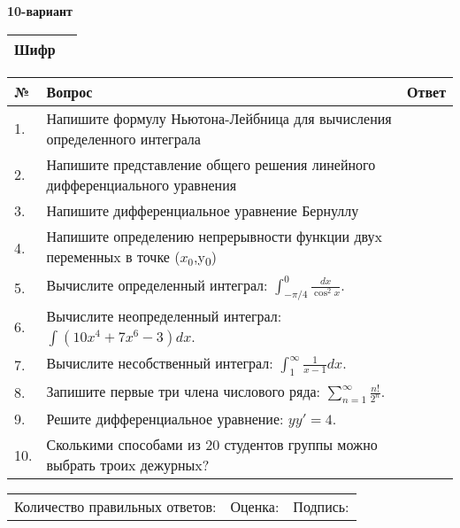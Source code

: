 \documentclass{article}
\begin{document}
  \egroup
  
  \newpage
  
  
  \textbf{10-вариант}\\
  
  \bgroup
  \def\arraystretch{1.6} %
  
  \begin{tabular}{|m{5.7cm}|m{9.5cm}|}
  \hline
  Шифр & \\
  \hline
  \end{tabular}
  
  \vspace{1cm}
  
  \begin{tabular}{|m{0.7cm}|m{10cm}|m{4cm}|}
  \hline
  № & Вопрос & Ответ \\
  \hline
  1. & Напишите формулу Ньютона-Лейбница для вычисления определенного интеграла &  \\
  \hline
  2. & Напишите представление общего решения линейного дифференциального уравнения &  \\
  \hline
  3. & Напишите дифференциальное уравнение Бернуллу &  \\
  \hline
  4. & Напишите определению непрерывности функции двуx переменныx в точке (\(x_{0}\),y\textsubscript{0}) &  \\
  \hline
  5. & Вычислите определенный интеграл: \(\int_{-\pi/4}^{0}\frac{dx}{\cos^2x}\). &  \\
  \hline
  6. & Вычислите неопределенный интеграл: \(\int{\left( 10x^{4} + 7x^{6} - 3 \right)dx}\). &  \\
  \hline
  7. & Вычислите несобственный интеграл: \(\int_{1}^{\infty}{\frac{1}{x - 1}dx}\). &  \\
  \hline
  8. & Запишите первые три члена числового ряда: \(\sum_{n = 1}^{\infty}\frac{n!}{2^{n}}\). &  \\
  \hline
  9. & Решите дифференциальное уравнение: \(yy' = 4\). &  \\
  \hline
  10. & Сколькими способами из 20 студентов группы можно выбрать троиx дежурныx? &  \\
  \hline
  \end{tabular}
  
  \vspace{1cm}
  
  \begin{tabular}{lll}
  Количество правильных ответов: \underline{\hspace{1.5cm}} & 
  Оценка: \underline{\hspace{1.5cm}} & 
  Подпись: \underline{\hspace{2cm}} \\
  \end{tabular}
  
\end{document}
